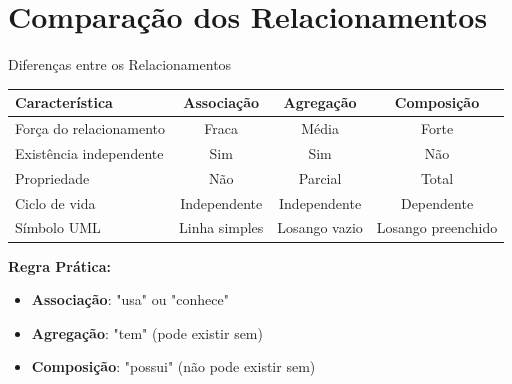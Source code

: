 \documentclass[aspectratio=169]{beamer}
\begin{document}
\section{Comparação dos Relacionamentos}

\begin{frame}{Diferenças entre os Relacionamentos}
\begin{center}
\begin{tabular}{|l|c|c|c|}
\hline
\textbf{Característica} & \textbf{Associação} & \textbf{Agregação} & \textbf{Composição} \\
\hline
Força do relacionamento & Fraca & Média & Forte \\
\hline
Existência independente & Sim & Sim & Não \\
\hline
Propriedade & Não & Parcial & Total \\
\hline
Ciclo de vida & Independente & Independente & Dependente \\
\hline
Símbolo UML & Linha simples & Losango vazio & Losango preenchido \\
\hline
\end{tabular}
\end{center}

\vspace{0.5cm}
\textbf{Regra Prática:}
\begin{itemize}
\item \textbf{Associação}: "usa" ou "conhece"
\item \textbf{Agregação}: "tem" (pode existir sem)
\item \textbf{Composição}: "possui" (não pode existir sem)
\end{itemize}
\end{frame}
\end{document}
